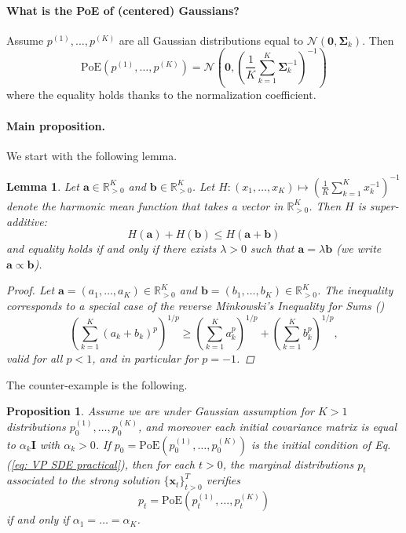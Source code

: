 \documentclass[10pt]{article} %
\newtheorem{proposition}{Proposition}[section]
\newtheorem{lemma}{Lemma}[section]
\def\rvx{{\mathbf{x}}}
\def\vzero{{\bm{0}}}
\def\mSigma{{\bm{\Sigma}}}
\begin{document}
\paragraph{What is the PoE of (centered) Gaussians?} Assume $p^{(1)},\dots,p^{(K)}$ are all Gaussian distributions equal to $\mathcal{N}(\vzero,\mSigma_k)$. Then
\begin{equation}\label{eq: PoE of Gaussians}
\text{PoE}(p^{(1)},\dots,p^{(K)}) = \mathcal{N}\left(\vzero,\left(\frac{1}{K}\sum_{k=1}^K \mSigma_{k}^{-1}\right)^{-1}\right)
\end{equation}
where the equality holds thanks to the normalization coefficient.

\paragraph{Main proposition.} We start with the following lemma.

\begin{lemma}\label{lemma: super additivity}
Let $\mathbf{a} \in \mathbb{R}^K_{>0}$ and $\mathbf{b} \in \mathbb{R}^K_{>0}$. Let $H: (x_1,\dots,x_K) \mapsto (\frac{1}{K}\sum_{k=1}^K x^{-1}_k)^{-1}$ denote the harmonic mean function that takes a vector in $\mathbb{R}^K_{>0}$. Then $H$ is super-additive:
\begin{equation}
H(\mathbf{a}) + H(\mathbf{b}) \leq H(\mathbf{a + b}) 
\end{equation}
and equality holds if and only if there exists $\lambda > 0$ such that $\mathbf{a} = \lambda\mathbf{b}$ (we write $\mathbf{a} \propto \mathbf{b}$).
\begin{proof}
Let $\mathbf{a} = (a_1,\dots,a_K) \in \mathbb{R}^K_{>0}$ and $\mathbf{b} = (b_1,\dots,b_K) \in \mathbb{R}^K_{>0}$. The inequality corresponds to a special case of the reverse Minkowski's Inequality for Sums ()
\begin{equation}
\left( \sum_{k=1}^K (a_k + b_k)^p \right)^{1/p}
\geq
\left( \sum_{k=1}^K a_k^p \right)^{1/p}
+
\left( \sum_{k=1}^K b_k^p \right)^{1/p},
\end{equation}
valid for all $p<1$, and in particular for $p=-1$.
\end{proof}
\end{lemma}

The counter-example is the following.
\begin{proposition}\label{proposition: counter example gaussian case}
Assume we are under Gaussian assumption for $K>1$ distributions $p_0^{(1)},\dots,p_0^{(K)}$, and moreover each initial covariance matrix is equal to $\alpha_k\bm{I}$ with $\alpha_k > 0$. If $p_0 = \text{PoE}(p_0^{(1)},\dots,p_0^{(K)})$ is the initial condition of Eq. (\ref{eq: VP SDE practical}), then for each $t>0$, the marginal distributions $p_t$ associated to the strong solution $\{\rvx_t\}_{t>0}^T$ verifies  
\begin{equation}
p_t = \text{PoE}(p^{(1)}_t, \dots,p^{(K)}_t) 
\end{equation}
if and only if $ \alpha_1 = \dots = \alpha_K$.

\end{proposition}
\end{document}
